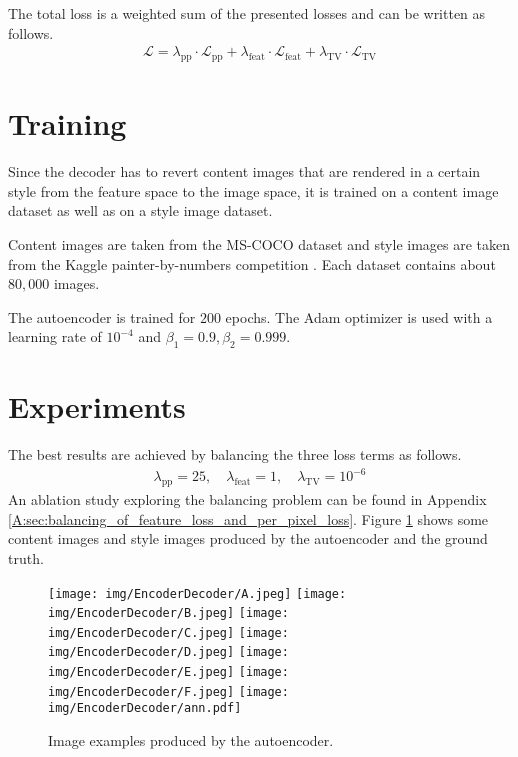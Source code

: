 The total loss is a weighted sum of the presented losses and can be written as follows.
\begin{align}\label{eq:autoencoder_loss_total}
\mathcal{L}
= 
\lambda_{\mathrm{pp}}
\cdot
\mathcal{L}_{\mathrm{pp}} +
\lambda_{\mathrm{feat}}
\cdot
\mathcal{L}_{\mathrm{feat}} +
\lambda_{\mathrm{TV}}
\cdot
\mathcal{L}_{\mathrm{TV}}
\end{align}

\section{Training}
Since the decoder has to revert content images that are rendered in a certain style from the feature space to the image space, it is trained on a content image dataset as well as on a style image dataset.

Content images are taken from the MS-COCO dataset \cite{Lin_2014_ECCV} and style images are taken from the Kaggle painter-by-numbers competition \cite{kaggle_painter_by_numbers}. Each dataset contains about $80, 000$ images.

The autoencoder is trained for $200$ epochs. The Adam optimizer \cite{Adam_2015_ICLR} is used with a learning rate of $10^{-4}$ and $\beta_1 = 0.9, \beta_2 = 0.999$.

\section{Experiments}
The best results are achieved by balancing the three loss terms as follows.
\begin{align}
\lambda_{\mathrm{pp}} = 25, \quad \lambda_{\mathrm{feat}} =1, \quad \lambda_{\mathrm{TV}} = 10^{-6}
\end{align}
An ablation study exploring the balancing problem can be found in Appendix \ref{A:sec:balancing_of_feature_loss_and_per_pixel_loss}. Figure \ref{fig:autoencoder_images} shows some content images and style images produced by the autoencoder and the ground truth.
\begin{figure}[!ht]
  \texttt{[image: img/EncoderDecoder/A.jpeg]}
\endminipage\hfill
{}
  \texttt{[image: img/EncoderDecoder/B.jpeg]}
\endminipage\hfill
{}
  \texttt{[image: img/EncoderDecoder/C.jpeg]}
\endminipage\hfill
{}
  \texttt{[image: img/EncoderDecoder/D.jpeg]}
\endminipage\hfill
{}
  \texttt{[image: img/EncoderDecoder/E.jpeg]}
\endminipage\hfill
{}
  \texttt{[image: img/EncoderDecoder/F.jpeg]}
\endminipage\hfill
  \texttt{[image: img/EncoderDecoder/ann.pdf]}
  \caption{Image examples produced by the autoencoder.}
  \label{fig:autoencoder_images}
\end{figure}